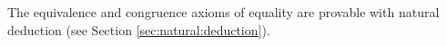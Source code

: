 %
\begin{lemma}\label{lemma:equivalence:congruence}
The equivalence and congruence axioms of equality are provable with natural deduction (see Section \vref{sec:natural:deduction}).\end{lemma}
